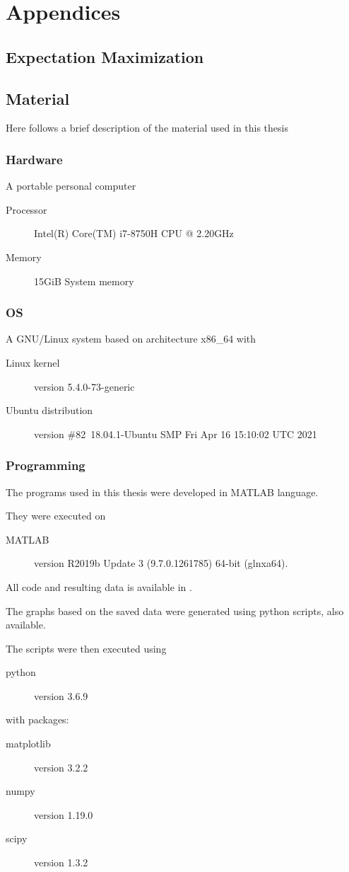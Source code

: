 \documentclass[../main.tex]{subfiles}
\begin{document}
\part{Appendices}
\chapter{Expectation Maximization}

\chapter{Material}
Here follows a brief description of the material used in this thesis
\section{Hardware}
A portable personal computer
\begin{description}
\item [Processor] Intel(R) Core(TM) i7-8750H CPU @ 2.20GHz
\item [Memory] 15GiB System memory
\end{description}
\section{OS}
A GNU/Linux system based on architecture x86\_64 with
\begin{description}
    \item[Linux kernel] version 5.4.0-73-generic
    \item[Ubuntu distribution] version \#82~18.04.1-Ubuntu SMP Fri Apr 16 15:10:02 UTC 2021
\end{description}

\section{Programming}
The programs used in this thesis were developed in MATLAB language.

They were executed on
\begin{description}
\item[MATLAB] version R2019b Update 3 (9.7.0.1261785) 64-bit (glnxa64).
\end{description}

All code and resulting data is available in .

The graphs based on the saved data were generated using python scripts, also available.

The scripts were then executed using
\begin{description}
\item[python] version 3.6.9
\end{description}
with packages:
\begin{description}
    \item[matplotlib] version 3.2.2
    \item[numpy] version 1.19.0
    \item[scipy] version 1.3.2
\end{description}
\end{document}
